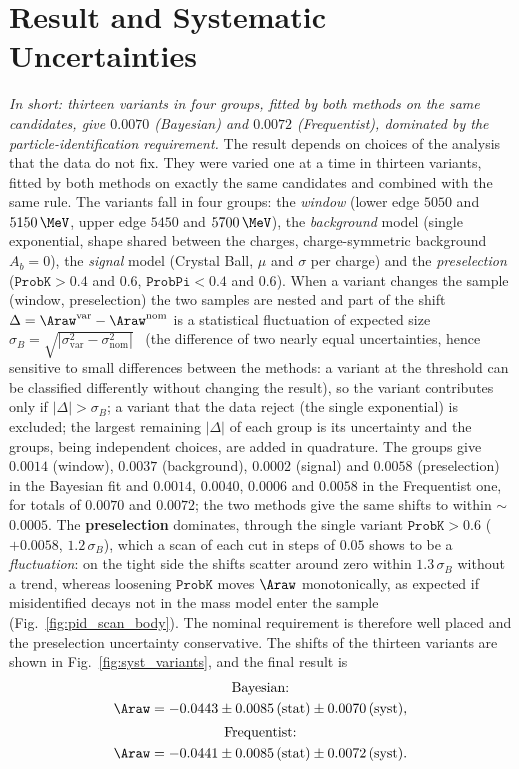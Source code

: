 \section{Result and Systematic Uncertainties}
\label{sec:syst}
\emph{In short: thirteen variants in four groups, fitted by both methods on the same candidates, give $0.0070$ (Bayesian) and $0.0072$ (Frequentist), dominated by the particle-identification requirement.}
The result depends on choices of the analysis that the data do not fix. They were varied one at a time in thirteen variants, fitted by both methods on exactly the same candidates and combined with the same rule. The variants fall in four groups: the \emph{window} (lower edge $5050$ and $5150\,\MeV$, upper edge $5450$ and $5700\,\MeV$), the \emph{background} model (single exponential, shape shared between the charges, charge-symmetric background $A_b=0$), the \emph{signal} model (Crystal Ball, $\mu$ and $\sigma$ per charge) and the \emph{preselection} ($\texttt{ProbK}>0.4$ and $0.6$, $\texttt{ProbPi}<0.4$ and $0.6$). When a variant changes the sample (window, preselection) the two samples are nested and part of the shift $\Delta=\Araw^{\mathrm{var}}-\Araw^{\mathrm{nom}}$ is a statistical fluctuation of expected size $\sigma_B=\sqrt{|\sigma_{\mathrm{var}}^2-\sigma_{\mathrm{nom}}^2|}$~\cite{barlow} (the difference of two nearly equal uncertainties, hence sensitive to small differences between the methods: a variant at the threshold can be classified differently without changing the result), so the variant contributes only if $|\Delta|>\sigma_B$; a variant that the data reject (the single exponential) is excluded; the largest remaining $|\Delta|$ of each group is its uncertainty and the groups, being independent choices, are added in quadrature.
The groups give $0.0014$ (window), $0.0037$ (background), $0.0002$ (signal) and $0.0058$ (preselection) in the Bayesian fit and $0.0014$, $0.0040$, $0.0006$ and $0.0058$ in the Frequentist one, for totals of $0.0070$ and $0.0072$; the two methods give the same shifts to within $\sim$$0.0005$. The \textbf{preselection} dominates, through the single variant $\texttt{ProbK}>0.6$ ($+0.0058$, $1.2\,\sigma_B$), which a scan of each cut in steps of $0.05$ shows to be a \emph{fluctuation}: on the tight side the shifts scatter around zero within $1.3\,\sigma_B$ without a trend, whereas loosening $\texttt{ProbK}$ moves $\Araw$ monotonically, as expected if misidentified decays not in the mass model enter the sample (Fig.~\ref{fig:pid_scan_body}). The nominal requirement is therefore well placed and the preselection uncertainty conservative. The shifts of the thirteen variants are shown in Fig.~\ref{fig:syst_variants}, and the final result is
\begin{gather*}
\text{Bayesian:}\\ \Araw=-0.0443\pm0.0085\,(\text{stat})\pm0.0070\,(\text{syst}),\\[2pt]
\text{Frequentist:}\\ \Araw=-0.0441\pm0.0085\,(\text{stat})\pm0.0072\,(\text{syst}).
\end{gather*}

